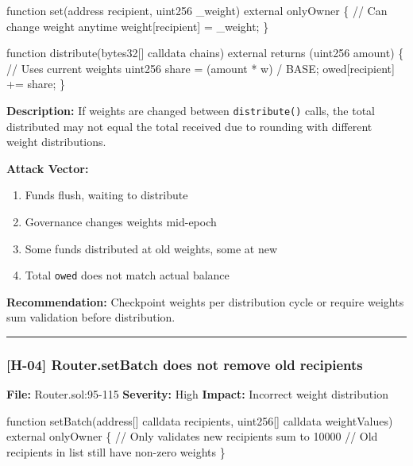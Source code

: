 \documentclass[
]{article}
\newenvironment{Shaded}{}{}
\newcommand{\NormalTok}[1]{#1}
\providecommand{\tightlist}{%
  \setlength{\itemsep}{0pt}\setlength{\parskip}{0pt}}
\begin{document}
\begin{Shaded}
\begin{Highlighting}[]
\NormalTok{function set(address recipient, uint256 \_weight) external onlyOwner \{}
\NormalTok{    // Can change weight anytime}
\NormalTok{    weight[recipient] = \_weight;}
\NormalTok{\}}

\NormalTok{function distribute(bytes32[] calldata chains) external returns (uint256 amount) \{}
\NormalTok{    // Uses current weights}
\NormalTok{    uint256 share = (amount * w) / BASE;}
\NormalTok{    owed[recipient] += share;}
\NormalTok{\}}
\end{Highlighting}
\end{Shaded}

\textbf{Description:} If weights are changed between
\texttt{distribute()} calls, the total distributed may not equal the
total received due to rounding with different weight distributions.

\textbf{Attack Vector:}

\begin{enumerate}
\def\labelenumi{\arabic{enumi}.}
\tightlist
\item
  Funds flush, waiting to distribute
\item
  Governance changes weights mid-epoch
\item
  Some funds distributed at old weights, some at new
\item
  Total \texttt{owed} does not match actual balance
\end{enumerate}

\textbf{Recommendation:} Checkpoint weights per distribution cycle or
require weights sum validation before distribution.

\begin{center}\rule{0.5\linewidth}{0.5pt}\end{center}

\subsubsection{{[}H-04{]} Router.setBatch does not remove old
recipients}\label{h-04-routersetbatch-does-not-remove-old-recipients}

\textbf{File:} Router.sol:95-115 \textbf{Severity:} High
\textbf{Impact:} Incorrect weight distribution

\begin{Shaded}
\begin{Highlighting}[]
\NormalTok{function setBatch(address[] calldata recipients, uint256[] calldata weightValues) external onlyOwner \{}
\NormalTok{    // Only validates new recipients sum to 10000}
\NormalTok{    // Old recipients in list still have non{-}zero weights}
\NormalTok{\}}
\end{Highlighting}
\end{Shaded}
\end{document}
